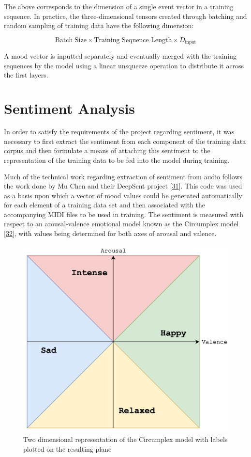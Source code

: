 \documentclass[12pt,]{article}
\begin{document}
The above corresponds to the dimension of a single event vector in a
training sequence. In practice, the three-dimensional tensors created
through batching and random sampling of training data have the following
dimension:

\[\text{Batch Size} \times \text{Training Sequence Length} \times D_{\text{input}}\]

A mood vector is inputted separately and eventually merged with the
training sequences by the model using a linear unsqueeze operation to
distribute it across the first layers.

\hypertarget{sentiment-analysis}{%
\section{Sentiment Analysis}\label{sentiment-analysis}}

In order to satisfy the requirements of the project regarding sentiment,
it was necessary to first extract the sentiment from each component of
the training data corpus and then formulate a means of attaching this
sentiment to the representation of the training data to be fed into the
model during training.

Much of the technical work regarding extraction of sentiment from audio
follows the work done by Mu Chen and their DeepSent project
{[}\protect\hyperlink{ref-deepsent}{31}{]}. This code was used as a
basis upon which a vector of mood values could be generated
automatically for each element of a training data set and then
associated with the accompanying MIDI files to be used in training. The
sentiment is measured with respect to an arousal-valence emotional model
known as the Circumplex model
{[}\protect\hyperlink{ref-russell1980circumplex}{32}{]}, with values
being determined for both axes of arousal and valence.

\begin{figure}
\centering
\includegraphics{Images/circumplex.png}
\caption{Two dimensional representation of the Circumplex model with
labels plotted on the resulting plane}
\end{figure}
\end{document}

